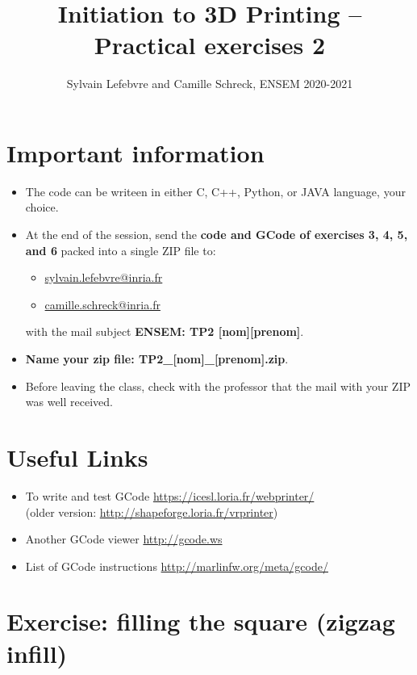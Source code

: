 \documentclass{article}
\date{\displaydate{date}}
\title{Initiation to 3D Printing -- Practical exercises 2}
\author{Sylvain Lefebvre and Camille Schreck, ENSEM 2020-2021}
\begin{document}
\maketitle

\section{Important information}
\begin{itemize}
    \item The code can be writeen in either C, C++, Python, or JAVA language, your choice.
    \item At the end of the session, send the {\bfseries code and GCode of exercises 3, 4, 5, and 6} packed into a single ZIP file to:
    \begin{itemize}
        \item \href{mailto:sylvain.lefebvre@inria.fr}{sylvain.lefebvre@inria.fr}
        \item \href{mailto:camille.schreck@inria.fr}{camille.schreck@inria.fr}
    \end{itemize}
    with the mail subject {\bfseries ENSEM: TP2 [nom][prenom]}.
    \item {\bfseries Name your zip file: TP2\_[nom]\_[prenom].zip}.
    \item Before leaving the class, check with the professor that the mail with your ZIP was well received.
\end{itemize}

\section{Useful Links}

\begin{itemize}
	\item To write and test GCode \url{https://icesl.loria.fr/webprinter/}\\ (older version: \url{http://shapeforge.loria.fr/vrprinter})
	\item Another GCode viewer \url{http://gcode.ws}
	\item List of GCode instructions \url{http://marlinfw.org/meta/gcode/}
\end{itemize}

\section{Exercise: filling the square (zigzag infill)}
\end{document}
